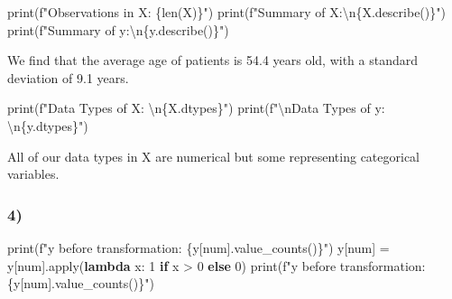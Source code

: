 \documentclass[
  11pt,
  letterpaper,
  DIV=11,
  numbers=noendperiod]{scrartcl}
\newenvironment{Shaded}{\begin{snugshade}}{\end{snugshade}}
\newcommand{\BuiltInTok}[1]{\textcolor[rgb]{0.00,0.23,0.31}{#1}}
\newcommand{\CharTok}[1]{\textcolor[rgb]{0.13,0.47,0.30}{#1}}
\newcommand{\ControlFlowTok}[1]{\textcolor[rgb]{0.00,0.23,0.31}{\textbf{#1}}}
\newcommand{\DecValTok}[1]{\textcolor[rgb]{0.68,0.00,0.00}{#1}}
\newcommand{\KeywordTok}[1]{\textcolor[rgb]{0.00,0.23,0.31}{\textbf{#1}}}
\newcommand{\NormalTok}[1]{\textcolor[rgb]{0.00,0.23,0.31}{#1}}
\newcommand{\OperatorTok}[1]{\textcolor[rgb]{0.37,0.37,0.37}{#1}}
\newcommand{\SpecialCharTok}[1]{\textcolor[rgb]{0.37,0.37,0.37}{#1}}
\newcommand{\SpecialStringTok}[1]{\textcolor[rgb]{0.13,0.47,0.30}{#1}}
\newcommand{\StringTok}[1]{\textcolor[rgb]{0.13,0.47,0.30}{#1}}
\begin{document}
\begin{Shaded}
\begin{Highlighting}[]
\BuiltInTok{print}\NormalTok{(}\SpecialStringTok{f"Observations in X: }\SpecialCharTok{\{}\BuiltInTok{len}\NormalTok{(X)}\SpecialCharTok{\}}\SpecialStringTok{"}\NormalTok{)}
\BuiltInTok{print}\NormalTok{(}\SpecialStringTok{f"Summary of X:}\CharTok{\textbackslash{}n}\SpecialCharTok{\{}\NormalTok{X}\SpecialCharTok{.}\NormalTok{describe()}\SpecialCharTok{\}}\SpecialStringTok{"}\NormalTok{)}
\BuiltInTok{print}\NormalTok{(}\SpecialStringTok{f"Summary of y:}\CharTok{\textbackslash{}n}\SpecialCharTok{\{}\NormalTok{y}\SpecialCharTok{.}\NormalTok{describe()}\SpecialCharTok{\}}\SpecialStringTok{"}\NormalTok{)}
\end{Highlighting}
\end{Shaded}

We find that the average age of patients is 54.4 years old, with a
standard deviation of 9.1 years.

\begin{Shaded}
\begin{Highlighting}[]
\BuiltInTok{print}\NormalTok{(}\SpecialStringTok{f"Data Types of X: }\CharTok{\textbackslash{}n}\SpecialCharTok{\{}\NormalTok{X}\SpecialCharTok{.}\NormalTok{dtypes}\SpecialCharTok{\}}\SpecialStringTok{"}\NormalTok{)}
\BuiltInTok{print}\NormalTok{(}\SpecialStringTok{f"}\CharTok{\textbackslash{}n}\SpecialStringTok{Data Types of y: }\CharTok{\textbackslash{}n}\SpecialCharTok{\{}\NormalTok{y}\SpecialCharTok{.}\NormalTok{dtypes}\SpecialCharTok{\}}\SpecialStringTok{"}\NormalTok{)}
\end{Highlighting}
\end{Shaded}

All of our data types in X are numerical but some representing
categorical variables.

\subsubsection{4)}\label{section-3}

\begin{Shaded}
\begin{Highlighting}[]
\BuiltInTok{print}\NormalTok{(}\SpecialStringTok{f"y before transformation: }\SpecialCharTok{\{}\NormalTok{y[}\StringTok{\textquotesingle{}num\textquotesingle{}}\NormalTok{]}\SpecialCharTok{.}\NormalTok{value\_counts()}\SpecialCharTok{\}}\SpecialStringTok{"}\NormalTok{)}
\NormalTok{y[}\StringTok{\textquotesingle{}num\textquotesingle{}}\NormalTok{] }\OperatorTok{=}\NormalTok{ y[}\StringTok{\textquotesingle{}num\textquotesingle{}}\NormalTok{].}\BuiltInTok{apply}\NormalTok{(}\KeywordTok{lambda}\NormalTok{ x: }\DecValTok{1} \ControlFlowTok{if}\NormalTok{ x }\OperatorTok{\textgreater{}} \DecValTok{0} \ControlFlowTok{else} \DecValTok{0}\NormalTok{)}
\BuiltInTok{print}\NormalTok{(}\SpecialStringTok{f"y before transformation: }\SpecialCharTok{\{}\NormalTok{y[}\StringTok{\textquotesingle{}num\textquotesingle{}}\NormalTok{]}\SpecialCharTok{.}\NormalTok{value\_counts()}\SpecialCharTok{\}}\SpecialStringTok{"}\NormalTok{)}
\end{Highlighting}
\end{Shaded}
\end{document}
